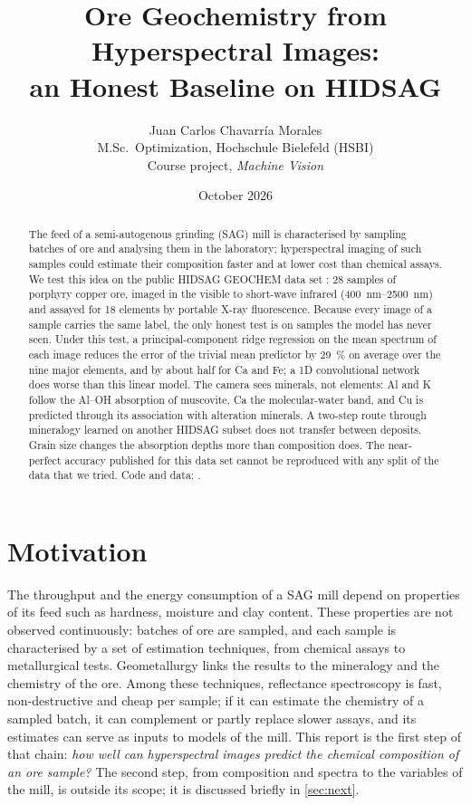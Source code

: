 \documentclass[11pt,a4paper]{article}
\title{Ore Geochemistry from Hyperspectral Images:\\ an Honest Baseline on HIDSAG}
\author{Juan Carlos Chavarr\'ia Morales\\[2pt]
  \small M.Sc.\ Optimization, Hochschule Bielefeld (HSBI)\\
  \small Course project, \emph{Machine Vision}}
\date{October 2026}
\begin{document}
\maketitle

\begin{abstract}
The feed of a semi-autogenous grinding (SAG) mill is characterised by sampling batches of ore and analysing them in
the laboratory; hyperspectral imaging of such samples could estimate their composition faster and at lower cost than
chemical assays. We test this idea on the public HIDSAG GEOCHEM data set \citep{Ehrenfeld2023}:
28 samples of porphyry copper ore, imaged in the visible to short-wave infrared (\SIrange{400}{2500}{nm}) and assayed
for 18 elements by portable X-ray fluorescence. Because every image of a sample carries the same label, the only
honest test is on samples the model has never seen. Under this test, a principal-component ridge regression on the
mean spectrum of each image reduces the error of the trivial mean predictor by \SI{29}{\percent} on average over the
nine major elements, and by about half for Ca and Fe; a 1D convolutional network does worse than this linear model.
The camera sees minerals, not elements: Al and K follow the Al--OH absorption of muscovite, Ca the molecular-water
band, and Cu is predicted through its association with alteration minerals. A two-step route through mineralogy
learned on another HIDSAG subset does not transfer between deposits. Grain size changes the absorption
depths more than composition does. The near-perfect accuracy published for this data set cannot be reproduced with
any split of the data that we tried. Code and data: \citet{Repo}.
\end{abstract}

\section{Motivation}

The throughput and the energy consumption of a SAG mill depend on properties of its feed such as hardness, moisture
and clay content. These properties are not observed continuously: batches of ore are sampled, and each sample is
characterised by a set of estimation techniques, from chemical assays to metallurgical tests. Geometallurgy links
the results to the mineralogy and the chemistry of the ore. Among these techniques, reflectance spectroscopy is fast,
non-destructive and cheap per sample; if it can estimate the chemistry of a sampled batch, it can complement or
partly replace slower assays, and its estimates can serve as inputs to models of the mill. This report is the first
step of that chain: \emph{how well can hyperspectral
images predict the chemical composition of an ore sample?} The second step, from composition and spectra to the
variables of the mill, is outside its scope; it is discussed briefly in \cref{sec:next}.
\end{document}
